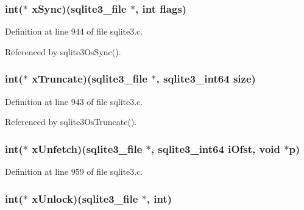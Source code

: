 \subsubsection[{x\+Sync}]{\setlength{\rightskip}{0pt plus 5cm}int($\ast$ x\+Sync)({\bf sqlite3\+\_\+file} $\ast$, int flags)}\label{structsqlite3__io__methods_a66cbb6be226b7c7a09d2f3c43a9f95b5}


Definition at line 944 of file sqlite3.\+c.



Referenced by sqlite3\+Os\+Sync().

\hypertarget{structsqlite3__io__methods_a206ff66f685638f41a052036912f3303}{}
\subsubsection[{x\+Truncate}]{\setlength{\rightskip}{0pt plus 5cm}int($\ast$ x\+Truncate)({\bf sqlite3\+\_\+file} $\ast$, {\bf sqlite3\+\_\+int64} size)}\label{structsqlite3__io__methods_a206ff66f685638f41a052036912f3303}


Definition at line 943 of file sqlite3.\+c.



Referenced by sqlite3\+Os\+Truncate().

\hypertarget{structsqlite3__io__methods_a2c4ce3c8b28c5a4089bdc032f0b9c30c}{}
\subsubsection[{x\+Unfetch}]{\setlength{\rightskip}{0pt plus 5cm}int($\ast$ x\+Unfetch)({\bf sqlite3\+\_\+file} $\ast$, {\bf sqlite3\+\_\+int64} i\+Ofst, void $\ast$p)}\label{structsqlite3__io__methods_a2c4ce3c8b28c5a4089bdc032f0b9c30c}


Definition at line 959 of file sqlite3.\+c.

\hypertarget{structsqlite3__io__methods_a8029cb982202ac5d08f5a556f3b3d49b}{}
\subsubsection[{x\+Unlock}]{\setlength{\rightskip}{0pt plus 5cm}int($\ast$ x\+Unlock)({\bf sqlite3\+\_\+file} $\ast$, int)}\label{structsqlite3__io__methods_a8029cb982202ac5d08f5a556f3b3d49b}


